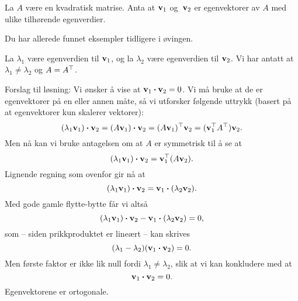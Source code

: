 \begin{losning}
La $A$ være en kvadratisk matrise. Anta at $\mathbf{v}_1$ og~$\mathbf{v}_2$ er egenvektorer av $A$ med ulike tilhørende egenverdier.

\begin{punkt}
Du har allerede funnet eksempler tidligere i øvingen.
\end{punkt}

\begin{punkt}
La $\lambda_1$ være egenverdien til $\mathbf{v}_1$, og la $\lambda_2$ være egenverdien til $\mathbf{v}_2$. Vi har antatt at $\lambda_1\neq\lambda_2$ og $A=A^\top$.

\noindent
Forslag til løsning: Vi ønsker å vise at $\mathbf{v}_1 
\boldsymbol{\cdot}\mathbf{v}_2=0$. Vi må bruke at de er 
egenvektorer på en eller annen måte, så vi utforsker følgende 
uttrykk (basert på at egenvektorer kun skalerer vektorer):
$$(\lambda_1\mathbf{v}_1 )\boldsymbol{\cdot}\mathbf{v}_2=(A\mathbf{v}_1 )
\boldsymbol{\cdot}\mathbf{v}_2=(A\mathbf{v}_1 )^\top\mathbf{v}_2=(\mathbf{v}_1^\top A
^\top)\mathbf{v}_2.$$ Men nå kan vi bruke antagelsen om at $A$ er 
symmetrisk til å se at $$(\lambda_1\mathbf{v}_1 )\boldsymbol{\cdot}
\mathbf{v}_2=\mathbf{v}_1^\top(A\mathbf{v}_2).$$ Lignende regning som ovenfor 
gir nå at $$(\lambda_1\mathbf{v}_1 )\boldsymbol{\cdot}\mathbf{v}_2=\mathbf{v}
_1 \boldsymbol{\cdot}(\lambda_2\mathbf{v}_2).$$ Med gode gamle 
flytte-bytte får vi altså $$(\lambda_1\mathbf{v}_1 )
\boldsymbol{\cdot}\mathbf{v}_2-\mathbf{v}_1 \boldsymbol{\cdot}
(\lambda_2\mathbf{v}_2)=0,$$ som -- siden prikkproduktet er lineært 
-- kan skrives $$(\lambda_1-\lambda_2)(\mathbf{v}_1 
\boldsymbol{\cdot}\mathbf{v}_2)=0.$$ Men første faktor er ikke lik 
null fordi $\lambda_1\neq\lambda_2$, slik at vi kan konkludere 
med at $$\mathbf{v}_1 \boldsymbol{\cdot}\mathbf{v}_2=0.$$ Egenvektorene 
er ortogonale.
\end{punkt}

\end{losning}